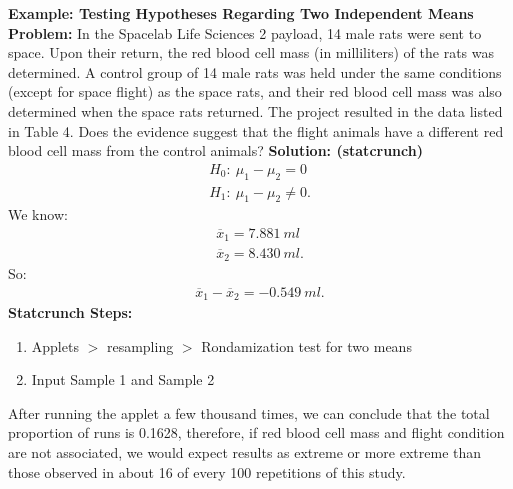 \documentclass{report}
\begin{document}
    \bigbreak \noindent 
    \begin{mdframed}
      \textbf{Example: Testing Hypotheses Regarding Two Independent Means}
      \bigbreak \noindent 
      \textbf{Problem:}
      In the Spacelab Life Sciences 2 payload, 14 male rats were sent to space. Upon their return, the red blood cell mass (in milliliters) of the rats was determined. A control group of 14 male rats was held under the same conditions (except for space flight) as the space rats, and their red blood cell mass was also determined when the space rats returned. The project resulted in the data listed in Table 4. Does the evidence suggest that the flight animals have a different red blood cell mass from the control animals?
      \bigbreak \noindent 
      \textbf{Solution: (statcrunch)}
      \bigbreak \noindent 
      \begin{align*}
          H_{0}:\ \mu_{1} - \mu_{2} = 0 \\
          H_{1}:\ \mu_{1} - \mu_{2} \ne 0 
      .\end{align*}
      We know:
      \begin{align*}
          \overline{x}_{1} = 7.881\ ml \\
          \overline{x}_{2} = 8.430\ ml
      .\end{align*}
      So:
      \begin{align*}
          \overline{x}_{1} - \overline{x}_{2} = -0.549\ ml
      .\end{align*}
      \bigbreak \noindent 
      \textbf{Statcrunch Steps:}
      \begin{enumerate}
          \item Applets $> $ resampling $> $ Rondamization test for two means 
            \item Input Sample 1 and Sample 2
      \end{enumerate}
      After running the applet a few thousand times, we can conclude that the total proportion of runs is 0.1628, therefore, if red blood cell mass and flight condition are not associated, we would expect results as extreme or more extreme than those observed in about 16 of every 100 repetitions of this study.
    \end{mdframed}

    \pagebreak 
\end{document}
